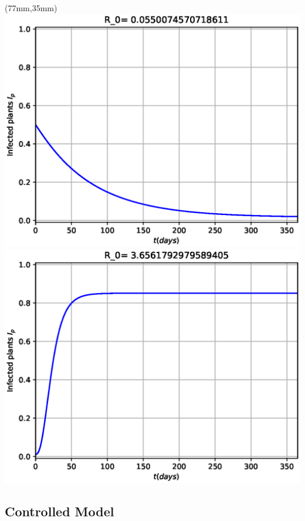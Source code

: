 \begin{frame}[plain]
\begin{textblock*}{55mm}
		\end{textblock*}
		\begin{textblock*}{50mm}(77mm,35mm)
			\only<2>
			{
				\includegraphics[width=\linewidth]{Feathergraphics/Tomato_simulation_1.eps}
			}
			\only<3>
			{
				\includegraphics[width=\linewidth]{Feathergraphics/Tomato_simulation_2.eps}
			}
		\end{textblock*}	
	\end{frame}
\subsection{Controlled Model}


